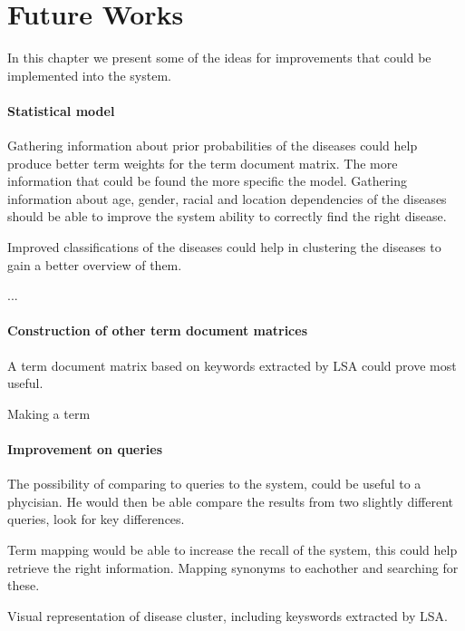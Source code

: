 \chapter{Future Works\label{FutureWorks}}

In this chapter we present some of the ideas for improvements that could be implemented into the system.

\subsubsection{Statistical model}
Gathering information about prior probabilities of the diseases could
help produce better term weights for the term document matrix. The
more information that could be found the more specific the
model. Gathering information about age, gender, racial and location
dependencies of the diseases should be able to improve the system
ability to correctly find the right disease.

Improved classifications of the diseases could help in clustering the
diseases to gain a better overview of them.

 ... 

\subsubsection{Construction of other term document matrices}
A term document matrix based on keywords extracted by LSA could prove
most useful.

Making a term

\subsubsection{Improvement on queries}
The possibility of comparing to queries to the system, could be useful
to a phycisian. He would then be able compare the results from two
slightly different queries, look for key differences.

Term mapping would be able to increase the recall of the system, this
could help retrieve the right information. Mapping synonyms to
eachother and searching for these.

Visual representation of disease cluster, including keyswords
extracted by LSA.

